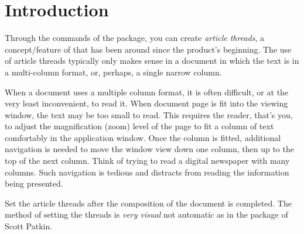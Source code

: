 \documentclass{article}
\begin{document}
\maketitle

\tableofcontents
{}




\section{Introduction}

%



\begin{multicols}{2}
\noindent{}%
%
\noindent Through the commands of the  package, you can
create \textit{article threads}, a concept/feature of  that has been around since the product's beginning. The use
of article threads typically only makes sense in a document in which the text
is in a multi-column format, or, perhaps, a single narrow column.

When a document uses a multiple column format, it is often difficult, or at
the very least inconvenient, to read it. When document page is fit into the viewing
window, the text may be too small to read. This requires the reader, that's
you, to adjust the magnification (zoom) level of the page to fit a column of
text comfortably in the application window.
Once the column is fitted, additional navigation is needed to move the window
view down one column, then up to the top of the next column. Think of trying
to read a digital newspaper with many columns. Such navigation is tedious and
distracts from reading the information being presented.

Set the article threads after the composition of the document is completed.
The method of setting the threads is \emph{very visual} not automatic as in
the  package of Scott Patkin.

\end{multicols}
\end{document}
